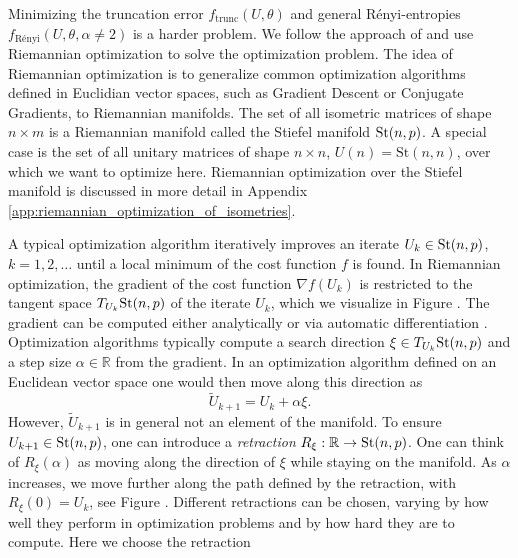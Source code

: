 Minimizing the truncation error $f_\text{trunc}\left(U,\theta\right)$ and general Rényi-entropies $f_\text{Rényi}\left(U,\theta,\alpha\neq2\right)$ is a harder problem. We follow the approach of \cite{cite:isometric_tensor_network_states_in_two_dimensions, cite:efficient_simulation_of_dynamics_in_two_dimensional_quantum_spin_systems} and use Riemannian optimization \cite{cite:optimization_on_matrix_manifolds, cite:riemannian_optimization_isometric_tensor_networks, cite:riemannian_geometry_automatic_differentiation_quantum_physics, cite:pymanopt} to solve the optimization problem. The idea of Riemannian optimization is to generalize common optimization algorithms defined in Euclidian vector spaces, such as Gradient Descent or Conjugate Gradients, to Riemannian manifolds. The set of all isometric matrices of shape $n\times m$ is a Riemannian manifold called the Stiefel manifold $\text{St}(n,p)$. A special case is the set of all unitary matrices of shape $n\times n$, $U(n)=\text{St}(n, n)$, over which we want to optimize here. Riemannian optimization over the Stiefel manifold is discussed in more detail in Appendix \ref{app:riemannian_optimization_of_isometries}. \par
A typical optimization algorithm iteratively improves an iterate $U_k\in\text{St}(n,p)$, $k=1,2,\dots$ until a local minimum of the cost function $f$ is found. In Riemannian optimization, the gradient of the cost function $\nabla f\left(U_k\right)$ is restricted to the tangent space $T_{U_k}\text{St}(n,p)$ of the iterate $U_k$, which we visualize in Figure . The gradient can be computed either analytically or via automatic differentiation \cite{cite:riemannian_geometry_automatic_differentiation_quantum_physics, cite:pymanopt}. Optimization algorithms typically compute a search direction $\xi\in T_{U_k}\text{St}(n,p)$ and a step size $\alpha \in \mathbb{R}$ from the gradient. In an optimization algorithm defined on an Euclidean vector space one would then move along this direction as
\begin{equation}
	\tilde{U}_{k+1} = U_k + \alpha\xi.
\end{equation}
However, $\tilde{U}_{k+1}$ is in general not an element of the manifold. To ensure $U_{k+1}\in\text{St}(n,p)$, one can introduce a \textit{retraction} $R_\xi:\mathbb{R}\to\text{St}(n,p)$. One can think of $R_\xi\left(\alpha\right)$ as moving along the direction of $\xi$ while staying on the manifold. As $\alpha$ increases, we move further along the path defined by the retraction, with $R_\xi(0) = U_k$, see Figure . Different retractions can be chosen, varying by how well they perform in optimization problems and by how hard they are to compute. Here we choose the retraction
